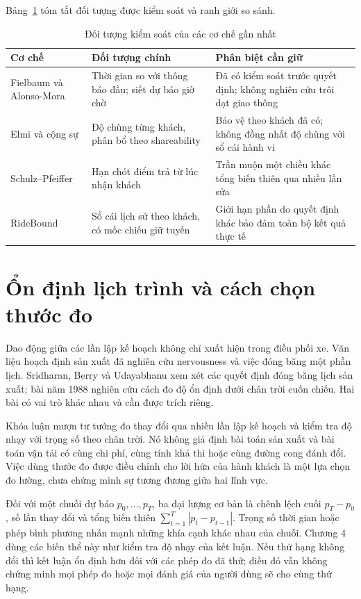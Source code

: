 Bảng~\ref{bang:ranhgioivanlieu} tóm tắt đối tượng được kiểm soát và ranh giới so sánh.

\begin{table}[htbp]
\centering
\caption{Đối tượng kiểm soát của các cơ chế gần nhất}
\label{bang:ranhgioivanlieu}
\small
\begin{tabular}{@{}>{\raggedright\arraybackslash}p{3.2cm}>{\raggedright\arraybackslash}p{5.4cm}>{\raggedright\arraybackslash}p{5.4cm}@{}}
\toprule
\textbf{Cơ chế} & \textbf{Đối tượng chính} & \textbf{Phân biệt cần giữ}\\
\midrule
Fielbaum và Alonso-Mora & Thời gian so với thông báo đầu; siết dự báo giờ chờ & Đã có kiểm
soát trước quyết định; không nghiên cứu trôi dạt giao thông\\[3pt]
Elmi và cộng sự & Độ chùng từng khách, phân bổ theo shareability & Bảo vệ theo khách đã có;
không đồng nhất độ chùng với sổ cái hành vi\\[3pt]
Schulz--Pfeiffer & Hạn chót điểm trả từ lúc nhận khách & Trần muộn một chiều khác tổng
biến thiên qua nhiều lần sửa\\[3pt]
RideBound & Sổ cái lịch sử theo khách, có mốc chiếu giữ tuyến & Giới hạn phần do quyết định
khác bảo đảm toàn bộ kết quả thực tế\\
\bottomrule
\end{tabular}
\end{table}

\section{Ổn định lịch trình và cách chọn thước đo}

Dao động giữa các lần lập kế hoạch không chỉ xuất hiện trong điều phối xe. Văn liệu
hoạch định sản xuất đã nghiên cứu nervousness và việc đóng băng một phần lịch.
Sridharan, Berry và Udayabhanu \cite{sridharan1987} xem xét các quyết định đóng băng
lịch sản xuất; bài năm 1988 \cite{sridharan1988} nghiên cứu cách đo độ ổn định dưới
chân trời cuốn chiếu. Hai bài có vai trò khác nhau và cần được trích riêng.

Khóa luận mượn tư tưởng đo thay đổi qua nhiều lần lập kế hoạch và kiểm tra độ nhạy với
trọng số theo chân trời. Nó không giả định bài toán sản xuất và bài toán vận tải có
cùng chi phí, cùng tính khả thi hoặc cùng đường cong đánh đổi. Việc dùng thước đo
được điều chỉnh cho lời hứa của hành khách là một lựa chọn đo lường, chưa chứng minh
sự tương đương giữa hai lĩnh vực.

Đối với một chuỗi dự báo $p_0,\ldots,p_T$, ba đại lượng cơ bản là chênh lệch cuối
$p_T-p_0$, số lần thay đổi và tổng biến thiên $\sum_{t=1}^T|p_t-p_{t-1}|$.
Trọng số thời gian hoặc phép bình phương nhấn mạnh những khía cạnh khác nhau của
chuỗi. Chương 4 dùng các biến thể này như kiểm tra độ nhạy của kết luận. Nếu thứ hạng
không đổi thì kết luận ổn định hơn đối với các phép đo đã thử; điều đó vẫn không
chứng minh mọi phép đo hoặc mọi đánh giá của người dùng sẽ cho cùng thứ hạng.

